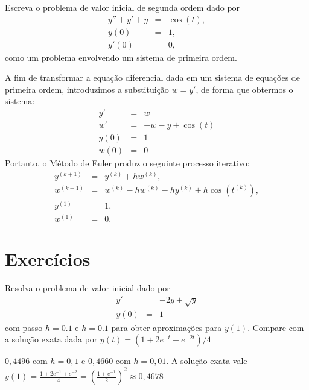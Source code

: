 \begin{ex} Escreva o problema de valor inicial de segunda ordem dado por
\begin{eqnarray*}
y''+y'+y&=&\cos(t),\\
y(0)&=&1,\\
y'(0)&=&0,
\end{eqnarray*}
como um problema envolvendo um sistema de primeira ordem.
\end{ex}
A fim de transformar a equação diferencial dada em um sistema de equações de primeira ordem, introduzimos a substituição $w=y'$, de forma que obtermos o sistema:
\begin{eqnarray*}
y'&=&w\\
w'&=&-w-y+\cos(t)\\
y(0)&=&1\\
w(0)&=&0
\end{eqnarray*}
Portanto, o Método de Euler produz o seguinte processo iterativo:
\begin{eqnarray*}
y^{(k+1)}&=&y^{(k)}+hw^{(k)},\\
w^{(k+1)}&=&w^{(k)}-hw^{(k)}-hy^{(k)}+h\cos(t^{(k)}),\\
y^{(1)}&=&1,\\
w^{(1)}&=&0.
\end{eqnarray*}
\section*{Exercícios}

\begin{Exercise}Resolva o problema de valor inicial dado por
\begin{eqnarray*}
y'&=& -2y + \sqrt{y}\\
y(0)&=&1
\end{eqnarray*}
com passo $h=0.1$ e $h=0.1$ para obter aproximações para $y(1)$. Compare com a solução exata dada por $y(t) =  \left({1+2 e^{-t}+e^{-2 t}}\right)/{4}$
\end{Exercise}
\begin{Answer}
  \begin{tiny}
 $0,4496$ com $h=0,1$ e $0,4660$ com $h=0,01$. A solução exata vale $y(1)=\frac{1+2e^{-1}+e^{-2}}{4}= \left(\frac{1+e^{-1}}{2}\right)^2\approx 0,4678$    
  \end{tiny}
\end{Answer}


